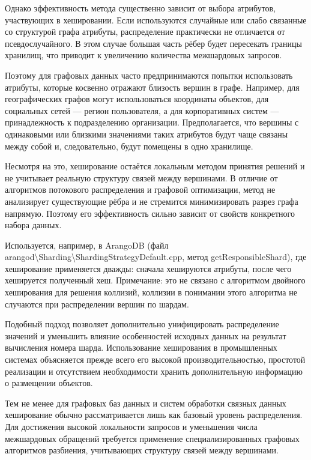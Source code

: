 Однако эффективность метода существенно зависит от выбора атрибутов, участвующих в хешировании. Если используются случайные или слабо связанные со структурой графа атрибуты, распределение практически не отличается от псевдослучайного. В этом случае большая часть рёбер будет пересекать границы хранилищ, что приводит к увеличению количества межшардовых запросов.

Поэтому для графовых данных часто предпринимаются попытки использовать атрибуты, которые косвенно отражают близость вершин в графе. Например, для географических графов могут использоваться координаты объектов, для социальных сетей --- регион пользователя, а для корпоративных систем --- принадлежность к подразделению организации. Предполагается, что вершины с одинаковыми или близкими значениями таких атрибутов будут чаще связаны между собой и, следовательно, будут помещены в одно хранилище.

Несмотря на это, хеширование остаётся локальным методом принятия решений и не учитывает реальную структуру связей между вершинами. В отличие от алгоритмов потокового распределения и графовой оптимизации, метод не анализирует существующие рёбра и не стремится минимизировать разрез графа напрямую. Поэтому его эффективность сильно зависит от свойств конкретного набора данных.

Используется, например, в ArangoDB \cite{ArangoDBRepo} (файл arangod\textbackslash Sharding\textbackslash ShardingStrategyDefault.cpp, метод getResponsibleShard), где хеширование применяется дважды: сначала хешируются атрибуты, после чего хешируется полученный хеш. Примечание: это не связано с алгоритмом двойного хеширования для решения коллизий, коллизии в понимании этого алгоритма не случаются при распределении вершин по шардам.

Подобный подход позволяет дополнительно унифицировать распределение значений и уменьшить влияние особенностей исходных данных на результат вычисления номера шарда. Использование хеширования в промышленных системах объясняется прежде всего его высокой производительностью, простотой реализации и отсутствием необходимости хранить дополнительную информацию о размещении объектов.

Тем не менее для графовых баз данных и систем обработки связных данных хеширование обычно рассматривается лишь как базовый уровень распределения. Для достижения высокой локальности запросов и уменьшения числа межшардовых обращений требуется применение специализированных графовых алгоритмов разбиения, учитывающих структуру связей между вершинами.
